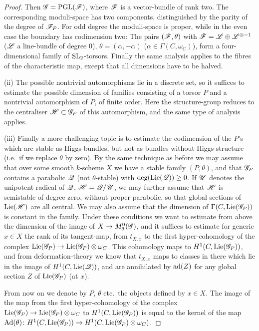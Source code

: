 \documentclass[12pt,english]{smfart}
\theoremstyle{plain} \newtheorem{innerthm}{Theorem} \newtheorem{innerlem}{Lemma} \newtheorem{innerprop}{Proposition} \newtheorem{innercor}{Corollary} \theoremstyle{definition} \newtheorem{innerdefn}{Definition} \newtheorem{innerconstr}{Construction} \theoremstyle{remark} \newtheorem*{remark}{Remark} \newtheorem*{remarks}{Remarks} \newtheorem*{applications}{Applications}
\begin{document}
\begin{proof}
Then $\mathscr{G}=\operatorname{PGL}(\mathscr{F})$, where $\mathscr{F}$ is a vector-bundle of rank two. The corresponding moduli-space has two components, distinguished by the parity of the degree of $\mathscr{F}_P$. For odd degree the moduli-space is proper, while in the even case the boundary has codimension two: The pairs $(\mathscr{F},\theta)$ with $\mathscr{F}=\mathscr{L}\oplus\mathscr{L}^{\otimes-1}$ ($\mathscr{L}$ a line-bundle of degree $0$), $\theta=(\alpha,-\alpha)$ ($\alpha\in\Gamma(C,\omega_C)$), form a four-dimensional family of $\operatorname{SL}_2$-torsors. Finally the same analysis applies to the fibres of the characteristic map, except that all dimensions have to be halved.

(ii) The possible nontrivial automorphisms lie in a discrete set, so it
suffices to estimate the possible dimension of families consisting of a torsor $P$ and a nontrivial automorphism of $P$, of finite order. Here the structure-group reduces to the centraliser $\mathscr{H}\subset\mathscr{G}_P$ of this automorphism, and the same type of analysis applies.

(iii) Finally a more challenging topic is to estimate the codimension of the $P$'s which are stable as Higgs-bundles, but not as bundles without Higgs-structure (i.e.\ if we replace $\theta$ by zero). By the same technique as before we may assume that over some smooth $k$-scheme $X$ we have a stable family $(P,\theta)$, and that $\mathscr{G}_P$ contains a parabolic $\mathscr{Q}$ (not $\theta$-stable) with $\deg(\operatorname{Lie}(\mathscr{Q}))\ge 0$. If $\mathscr{U}$ denotes the unipotent radical of $\mathscr{Q}$, $\mathscr{H}=\mathscr{Q}/\mathscr{U}$, we may further assume that $\mathscr{H}$ is semistable of degree zero, without proper parabolic, so that global sections of $\operatorname{Lie}(\mathscr{H})$ are all central. We may also assume that the dimension of $\Gamma(C,\operatorname{Lie}(\mathscr{G}_P))$ is constant in the family. Under these conditions we want to estimate from above the dimension of the image of $X\to M_\theta^0(\mathscr{G})$, and it suffices to estimate for generic $x\in X$ the rank of its tangent-map, from $t_{X,x}$ to the first hyper-cohomology of the complex $\operatorname{Lie}(\mathscr{G}_P)\to\operatorname{Lie}(\mathscr{G}_P)\otimes\omega_C$. This cohomology maps to $H^1(C,\operatorname{Lie}(\mathscr{G}_P))$, and from deformation-theory we know that $t_{X,x}$ maps to classes in there which lie in the image of $H^1(C,\operatorname{Lie}(\mathscr{Q}))$, and are annihilated by $\operatorname{ad}(Z)$ for any global section $Z$ of $\operatorname{Lie}(\mathscr{G}_P)$ (at $x$).

From now on we denote by $P$, $\theta$ etc.\ the objects defined by $x\in X$. The image of the map from the first hyper-cohomology of the complex $\operatorname{Lie}(\mathscr{G}_P)\to\operatorname{Lie}(\mathscr{G}_P)\otimes\omega_C$ to $H^1(C,\operatorname{Lie}(\mathscr{G}_P))$ is equal to the kernel of the map $\operatorname{Ad}(\theta)\colon H^1(C,\operatorname{Lie}(\mathscr{G}_P))\to H^1(C,\operatorname{Lie}(\mathscr{G}_P)\otimes\omega_C)$.


\end{proof}
\end{document}
